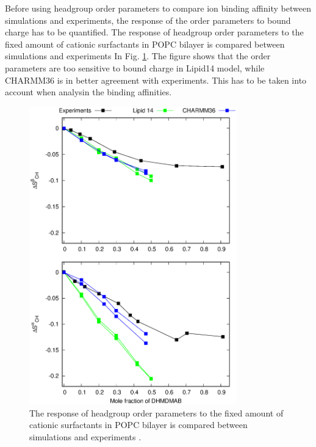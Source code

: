 \documentclass[aps,prl,superscriptaddress,twocolumn]{revtex4}
\begin{document}
Before using headgroup order parameters to compare ion binding affinity between simulations
and experiments, the response of the order parameters to bound charge has to be quantified.
The response of headgroup order parameters to the fixed amount of cationic surfactants in
POPC bilayer is compared between simulations and experiments \cite{scherer89} In Fig. \ref{CHANGESwithCaClPGPS}.
The figure shows that the order parameters are too sensitive to bound charge in Lipid14 model,
while CHARMM36 is in better agreement with experiments. This has to be taken into account when
analysin the binding affinities.
\begin{figure}[]
  \centering
  \includegraphics[width=9.0cm]{../Figs/HGopsDHMDMAB.eps}
  \caption{\label{CHANGESwithCaClPGPS}
  The response of headgroup order parameters to the fixed amount of cationic surfactants in
  POPC bilayer is compared between simulations and experiments \cite{scherer89}.}
\end{figure}
\end{document}
